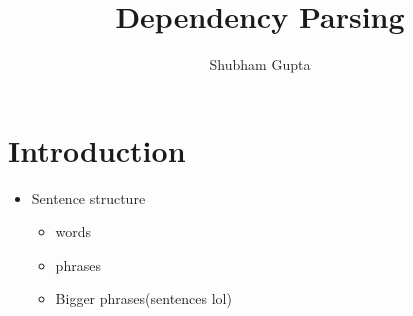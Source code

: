 \documentclass[a4paper]{article}
\title{Dependency Parsing}
\author{Shubham Gupta}
\begin{document}
\maketitle
\section{Introduction}
\begin{itemize}
    \item Sentence structure
        \begin{itemize}
            \item words
            \item phrases
            \item Bigger phrases(sentences lol)
        \end{itemize}
\end{itemize}
\end{document}
